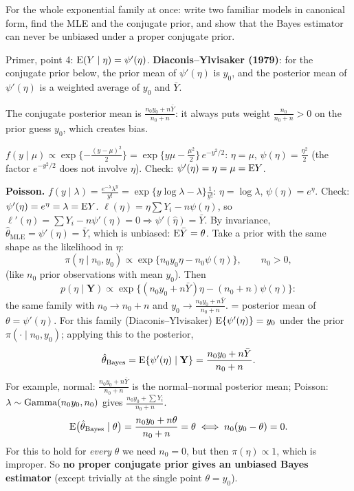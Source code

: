 \documentclass[11pt]{article}
\begin{document}
\begin{restate}
For the whole exponential family at once: write two familiar models in canonical form, find the MLE and the conjugate prior, and show that the Bayes estimator can never be unbiased under a proper conjugate prior.
\end{restate}

\begin{recall}
Primer, point 4: $\mathrm{E}(Y\mid\eta)=\psi'(\eta)$. \textbf{Diaconis--Ylvisaker (1979)}: for the conjugate prior below, the prior mean of $\psi'(\eta)$ is $y_0$, and the posterior mean of $\psi'(\eta)$ is a weighted average of $y_0$ and $\bar Y$.
\end{recall}

\begin{keyidea}
The conjugate posterior mean is $\frac{n_0y_0+n\bar Y}{n_0+n}$: it always puts weight $\frac{n_0}{n_0+n}>0$ on the prior guess $y_0$, which creates bias.
\end{keyidea}

\solution
{} $f(y\mid\mu)\propto\exp\{-\frac{(y-\mu)^2}2\}=\exp\{y\mu-\frac{\mu^2}{2}\}\,e^{-y^2/2}$: $\eta=\mu$, $\psi(\eta)=\frac{\eta^2}2$ (the factor $e^{-y^2/2}$ does not involve $\eta$). Check: $\psi'(\eta)=\eta=\mu=\mathrm{E} Y$. \checkmark

\textbf{Poisson.} $f(y\mid\lambda)=\frac{e^{-\lambda}\lambda^y}{y!}=\exp\{y\log\lambda-\lambda\}\frac1{y!}$: $\eta=\log\lambda$, $\psi(\eta)=e^\eta$. Check: $\psi'(\eta)=e^\eta=\lambda=\mathrm{E} Y$. \checkmark
{} $\ell(\eta)=\eta\sum Y_i-n\psi(\eta)$, so $\ell'(\eta)=\sum Y_i-n\psi'(\eta)=0\Rightarrow\psi'(\hat\eta)=\bar Y$. By invariance, $\hat\theta_{\text{MLE}}=\psi'(\hat\eta)=\bar Y$, which is unbiased: $\mathrm{E}\bar Y=\theta$.
 Take a prior with the same shape as the likelihood in $\eta$:
\[
\pi(\eta\mid n_0,y_0)\propto\exp\{n_0y_0\eta-n_0\psi(\eta)\},\qquad n_0>0,
\]
(like $n_0$ prior observations with mean $y_0$). Then
\[
p(\eta\mid\mathbf Y)\propto\exp\{(n_0y_0+n\bar Y)\eta-(n_0+n)\psi(\eta)\}:
\]
the same family with $n_0\to n_0+n$ and $y_0\to\frac{n_0y_0+n\bar Y}{n_0+n}$.
 = posterior mean of $\theta=\psi'(\eta)$. For this family (Diaconis--Ylvisaker) $\mathrm{E}\{\psi'(\eta)\}=y_0$ under the prior $\pi(\cdot\mid n_0,y_0)$; applying this to the posterior,
\[
\hat\theta_{\text{Bayes}}=\mathrm{E}\{\psi'(\eta)\mid\mathbf Y\}=\frac{n_0y_0+n\bar Y}{n_0+n}.
\]
For example, normal: $\frac{n_0y_0+n\bar Y}{n_0+n}$ is the normal--normal posterior mean; Poisson: $\lambda\sim\mathrm{Gamma}(n_0y_0,n_0)$ gives $\frac{n_0y_0+\sum Y_i}{n_0+n}$.
\[
\mathrm{E}\big(\hat\theta_{\text{Bayes}}\mid\theta\big)=\frac{n_0y_0+n\theta}{n_0+n}=\theta\iff n_0(y_0-\theta)=0.
\]
For this to hold for \emph{every} $\theta$ we need $n_0=0$, but then $\pi(\eta)\propto1$, which is improper. So \textbf{no proper conjugate prior gives an unbiased Bayes estimator} (except trivially at the single point $\theta=y_0$).
\end{document}

